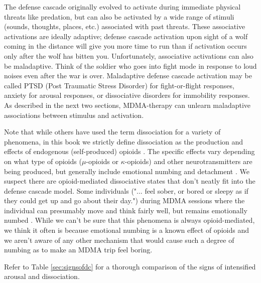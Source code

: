 \documentclass[12pt,letterpaper]{book}
\begin{document}
The defense cascade originally evolved to activate during immediate physical threats like predation, but can also be activated by a wide range of stimuli (sounds, thoughts, places, etc.) associated with past threats. These associative activations are ideally adaptive; defense cascade activation upon sight of a wolf coming in the distance will give you more time to run than if activation occurs only after the wolf has bitten you. Unfortunately, associative activations can also be maladaptive. Think of the soldier who goes into fight mode in response to loud noises even after the war is over. Maladaptive defense cascade activation may be called PTSD (Post Traumatic Stress Disorder) for fight-or-flight responses, anxiety for arousal responses, or dissociative disorders for immobility responses. As described in the next two sections, MDMA-therapy can unlearn maladaptive associations between stimulus and activation.

Note that while others have used the term dissociation for a variety of phenomena, in this book we strictly define dissociation as the production and effects of endogenous (self-produced) opioids \cite{kozlowskaDefenseCascade}. The specific effects vary depending on what type of opioids ($\mu$-opioids or $\kappa$-opioids) and other neurotransmitters are being produced, but generally include emotional numbing and detachment \cite{kozlowskaDefenseCascade,lanius2018review}. We suspect there are opioid-mediated dissociative states that don't neatly fit into the defense cascade model. Some individuals ("... feel sober, or bored or sleepy as if they could get up and go about their day.") during MDMA sessions where the individual can presumably move and think fairly well, but remains emotionally numbed \cite{razviPSIP}. While we can't be sure that this phenomena is always opioid-mediated, we think it often is because emotional numbing is a known effect of opioids \cite{lanius2018review} and we aren't aware of any other mechanism that would cause such a degree of numbing as to make an MDMA trip feel boring.


Refer to Table \ref{sec:signsofdc} for a thorough comparison of the signs of intensified arousal and dissociation.
\end{document}
